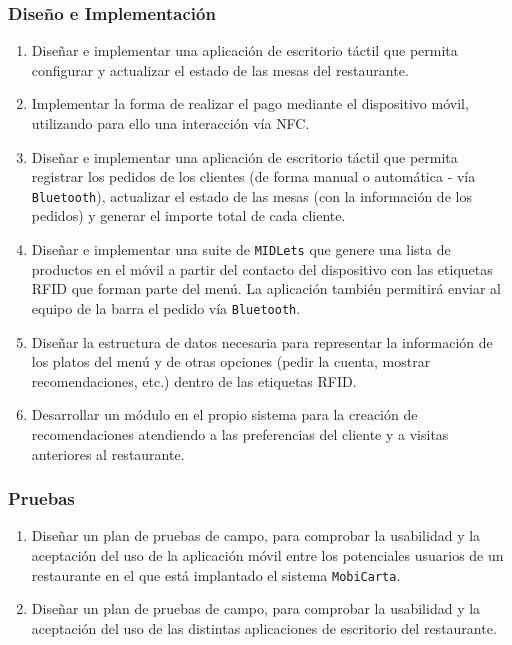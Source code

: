 \subsubsection{Diseño e Implementación}
\begin{enumerate}
\item Diseñar e implementar una aplicación de escritorio táctil que permita
  configurar y actualizar el estado de las mesas del restaurante.
\item Implementar la forma de realizar el pago mediante el dispositivo móvil,
  utilizando para ello una interacción vía \acs{NFC}.
\item Diseñar e implementar una aplicación de escritorio táctil que permita
  registrar los pedidos de los clientes (de forma manual o automática - vía
  \texttt{Bluetooth}), actualizar el estado de las mesas (con la información de
  los pedidos) y generar el importe total de cada cliente.
\item Diseñar e implementar una suite de \texttt{MIDLets} que genere una lista
  de productos en el móvil a partir del contacto del dispositivo con las
  etiquetas \acs{RFID} que forman parte del menú. La aplicación también
  permitirá enviar al equipo de la barra el pedido vía \texttt{Bluetooth}.
\item Diseñar la estructura de datos necesaria para representar la
  información de los platos del menú y de otras opciones (pedir la cuenta, 
  mostrar recomendaciones, etc.) dentro de las etiquetas \acs{RFID}.
\item Desarrollar un módulo en el propio sistema para la creación de
  recomendaciones atendiendo a las preferencias del cliente y a visitas
  anteriores al restaurante.
\end{enumerate}

\subsubsection{Pruebas}
\begin{enumerate}
\item Diseñar un plan de pruebas de campo, para comprobar la usabilidad y
la aceptación del uso de la aplicación móvil entre los potenciales
usuarios de un restaurante en el que está implantado el sistema
\texttt{MobiCarta}.
\item Diseñar un plan de pruebas de campo, para comprobar la usabilidad y
la aceptación del uso de las distintas aplicaciones de escritorio del
restaurante.
\end{enumerate}



